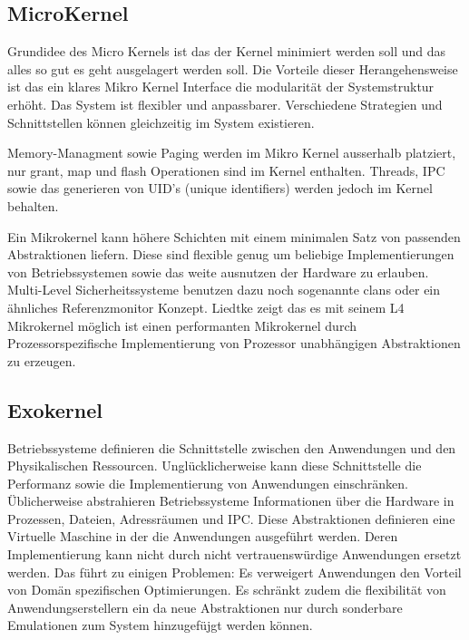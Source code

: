 \documentclass[9pt,technote]{IEEEtran}
\begin{document}
    \subsection{MicroKernel}
	    Grundidee des Micro Kernels ist das der Kernel minimiert werden soll und das alles so gut es geht ausgelagert werden soll.
	    Die Vorteile dieser Herangehensweise ist das ein klares Mikro Kernel Interface die modularit\"at der Systemstruktur erh\"oht.
	    Das System ist flexibler und anpassbarer. Verschiedene Strategien und Schnittstellen k\"onnen gleichzeitig im System existieren.
	    
	    Memory-Managment sowie Paging werden im Mikro Kernel ausserhalb platziert, nur grant, map und flash Operationen sind im Kernel enthalten. \cite[S. 238 f]{inproc:micro}
	    Threads, IPC sowie das generieren von UID's (unique identifiers) werden jedoch im Kernel behalten.
	    
	    Ein Mikrokernel kann h\"ohere Schichten mit einem minimalen Satz von passenden Abstraktionen liefern.
	    Diese sind flexible genug um beliebige Implementierungen von Betriebssystemen sowie das weite ausnutzen der Hardware zu erlauben.
	    Multi-Level Sicherheitssysteme benutzen dazu noch sogenannte clans oder ein \"ahnliches Referenzmonitor Konzept.        
	    Liedtke zeigt das es mit seinem L4 Mikrokernel m\"oglich ist einen performanten Mikrokernel durch Prozessorspezifische Implementierung 
	    von Prozessor unabh\"angigen Abstraktionen zu erzeugen.\cite[S. 248]{inproc:micro}
   
    \subsection{Exokernel}       
       Betriebssysteme definieren die Schnittstelle zwischen den Anwendungen und den Physikalischen Ressourcen.
       Ungl\"ucklicherweise kann diese Schnittstelle die Performanz sowie die Implementierung von Anwendungen einschr\"anken. \"Ublicherweise
       abstrahieren Betriebssysteme Informationen \"uber die Hardware in Prozessen, Dateien, Adressr\"aumen und IPC. Diese Abstraktionen definieren eine 
       Virtuelle Maschine in der die Anwendungen ausgef\"uhrt werden. Deren Implementierung kann nicht durch nicht vertrauensw\"urdige Anwendungen ersetzt werden.
        Das f\"uhrt zu einigen Problemen: Es verweigert Anwendungen den Vorteil von Dom\"an spezifischen Optimierungen. Es schr\"ankt zudem die flexibilit\"at von
        Anwendungserstellern ein da neue Abstraktionen nur durch sonderbare Emulationen zum System hinzugef\"ujgt werden k\"onnen.
        
\end{document}
